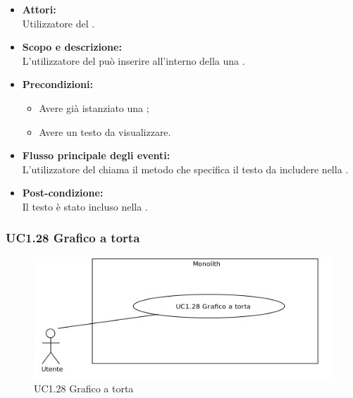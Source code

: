 \begin{itemize}
	\item \textbf{Attori:}
	\\Utilizzatore del .
	\item \textbf{Scopo e descrizione:} 
	\\L'utilizzatore del  può inserire all'interno della  una .
	\item \textbf{Precondizioni:}
	\begin{itemize}
		\item Avere già istanziato una ;
		\item Avere un testo da visualizzare.
	\end{itemize}
	\item \textbf{Flusso principale degli eventi:}
	\\L'utilizzatore del  chiama il metodo che specifica il testo da includere nella .
	\item \textbf{Post-condizione:}
	\\Il testo è stato incluso nella .
\end{itemize}

\subsubsection{UC1.28 Grafico a torta} \label{UC1.28}

\begin{figure}[H]
	\centering
	\includegraphics[width=15cm]{../../documenti/AnalisiDeiRequisiti/Diagrammi_img/uc1_28.png}
	\caption{UC1.28 Grafico a torta}
\end{figure}

